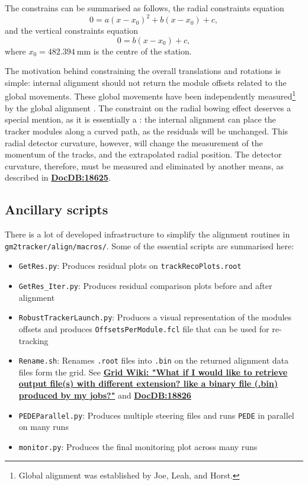\documentclass[12pt]{article}
\begin{document}
The constrains can be summarised as follows, the radial constraints equation
\begin{equation}
    0=a(x-x_0)^2+b(x-x_0)+c,   
\end{equation}
and the vertical constraints equation  
\begin{equation}
    0=b(x-x_0)+c,
\end{equation}
where $x_0=\SI{482.394}{\milli\metre}$ is the centre of the station.

The motivation behind constraining the overall translations and rotations is simple: internal alignment should not return the module offsets related to the global movements. These global movements have been independently measured\footnote{Global alignment was established by Joe, Leah, and Horst.} by the global alignment \cite{Joe}. The constraint on the radial bowing effect deserves a special mention, as it is essentially a : the internal alignment can place the tracker modules along a curved path, as the residuals will be unchanged. This radial detector curvature, however, will change the measurement of the momentum of the tracks, and the extrapolated radial position. The detector curvature, therefore, must be measured and eliminated by another means, as described in \textbf{\href{https://gm2-docdb.fnal.gov/cgi-bin/private/ShowDocument?docid=18625}{DocDB:18625}}.


\subsection{Ancillary scripts}
There is a lot of developed infrastructure to simplify the alignment routines in \\ \verb!gm2tracker/align/macros/!. Some of the essential scripts are summarised here: 
\begin{itemize}
    \item \verb!GetRes.py!: Produces residual plots on \verb!trackRecoPlots.root! 
    \item \verb!GetRes_Iter.py!:  Produces residual comparison plots before and after alignment 
    \item \verb!RobustTrackerLaunch.py!: Produces a visual representation of the modules offsets and produces \verb!OffsetsPerModule.fcl! file that can be used for re-tracking  
    \item \verb!Rename.sh!: Renames \verb!.root! files into \verb!.bin! on the returned alignment data files form the grid. See \textbf{\href{https://redmine.fnal.gov/redmine/projects/g-2/wiki/Job_Running_Submission_FAQ\#What-if-I-would-like-to-retrieve-output-files-with-different-extension-like-a-binary-file-bin-produced-by-my-jobs}{Grid Wiki: "What if I would like to retrieve output file(s) with different extension? like a binary file (.bin) produced by my jobs?"}} and \textbf{\href{https://gm2-docdb.fnal.gov/cgi-bin/private/ShowDocument?docid=18826}{DocDB:18826}} 
    \item \verb!PEDEParallel.py!: Produces multiple steering files and runs \texttt{PEDE} in parallel on many runs 
       \item \verb!monitor.py!: Produces the final monitoring plot across many runs 
\end{itemize}
\end{document}
